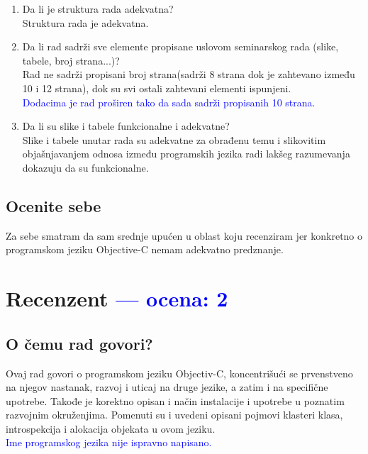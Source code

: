 \documentclass[a4paper]{report}
\newcommand{\odgovor}[1]{\textcolor{blue}{#1}}
\begin{document}
\begin{enumerate}
\item Da li je struktura rada adekvatna?\\
Struktura rada je adekvatna.

\item Da li rad sadrži sve elemente propisane uslovom seminarskog rada (slike, tabele, broj strana...)?\\
Rad ne sadrži propisani broj strana(sadrži 8 strana dok je zahtevano između 10 i 12 strana), dok su svi ostali zahtevani elementi ispunjeni. \\
\odgovor{Dodacima je rad proširen tako da sada sadrži propisanih 10 strana.}

\item Da li su slike i tabele funkcionalne i adekvatne?\\
Slike i tabele unutar rada su adekvatne za obrađenu temu i slikovitim objašnjavanjem odnosa između programskih jezika radi lakšeg razumevanja dokazuju da su funkcionalne.
\end{enumerate}

\section{Ocenite sebe}
Za sebe smatram da sam srednje upućen u oblast koju recenziram jer konkretno o programskom jeziku Objective-C nemam adekvatno predznanje.

\chapter{Recenzent \odgovor{--- ocena: 2} }


\section{O čemu rad govori?}
Ovaj rad govori o programskom jeziku Objectiv-C, koncentrišući se prvenstveno na njegov nastanak, razvoj i uticaj na druge jezike, a zatim i na specifične upotrebe. Takođe je korektno opisan i način instalacije i upotrebe u poznatim razvojnim okruženjima. Pomenuti su i uvedeni opisani pojmovi klasteri klasa, introspekcija i alokacija objekata u ovom jeziku. \\
\odgovor{Ime programskog jezika nije ispravno napisano.}
\end{document}

